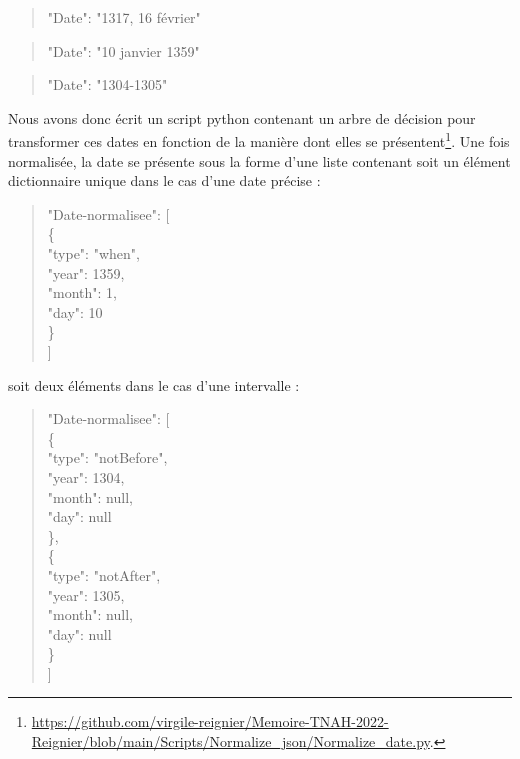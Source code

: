 \documentclass[a4paper,12pt,twoside]{book}
\begin{document}
	\begin{quotation}
		"Date": "1317, 16 février"
	\end{quotation}
	
	\begin{quotation}
		"Date": "10 janvier 1359"
	\end{quotation}

	\begin{quotation}
		"Date": "1304-1305"
	\end{quotation}
	
	\noindent Nous avons donc écrit un script python contenant un arbre de décision pour transformer ces dates en fonction de la manière dont elles se présentent\footnote{	\url{https://github.com/virgile-reignier/Memoire-TNAH-2022-Reignier/blob/main/Scripts/Normalize_json/Normalize_date.py}.}. Une fois normalisée, la date se présente sous la forme d'une liste contenant soit un élément dictionnaire unique dans le cas d'une date précise :

	\begin{quotation}
		"Date-normalisee": [\\
		\indent\indent\{\\
		\indent\indent	"type": "when",\\
		\indent\indent	"year": 1359,\\
		\indent\indent	"month": 1,\\
		\indent\indent	"day": 10\\
		\indent\indent\}\\
		\indent ]\\
	\end{quotation}
	
	\noindent soit deux éléments dans le cas d'une intervalle :
	
	\begin{quotation}
				"Date-normalisee": [\\
				\indent\indent		\{ \\
				\indent\indent		"type": "notBefore",\\
				\indent\indent		"year": 1304,\\
				\indent\indent		"month": null,\\
				\indent\indent		"day": null\\
				\indent\indent	\},\\
				\indent\indent	\{\\
				\indent\indent		"type": "notAfter",\\
				\indent\indent		"year": 1305,\\
				\indent\indent		"month": null,\\
				\indent\indent		"day": null\\
				\indent\indent	\}\\
				\indent	]\\
	\end{quotation}
	
\end{document}

